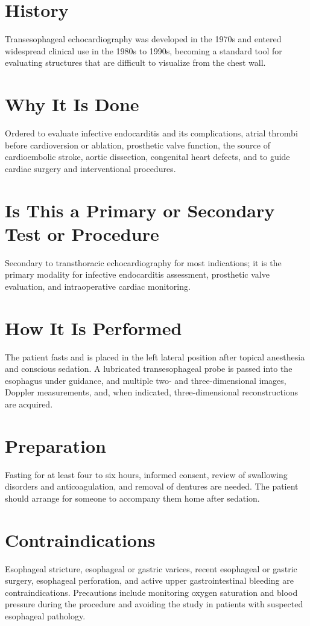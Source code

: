 \section*{History}
Transesophageal echocardiography was developed in the 1970s and entered widespread clinical use in the 1980s to 1990s, becoming a standard tool for evaluating structures that are difficult to visualize from the chest wall.

\section*{Why It Is Done}
Ordered to evaluate infective endocarditis and its complications, atrial thrombi before cardioversion or ablation, prosthetic valve function, the source of cardioembolic stroke, aortic dissection, congenital heart defects, and to guide cardiac surgery and interventional procedures.

\section*{Is This a Primary or Secondary Test or Procedure}
Secondary to transthoracic echocardiography for most indications; it is the primary modality for infective endocarditis assessment, prosthetic valve evaluation, and intraoperative cardiac monitoring.

\section*{How It Is Performed}
The patient fasts and is placed in the left lateral position after topical anesthesia and conscious sedation. A lubricated transesophageal probe is passed into the esophagus under guidance, and multiple two- and three-dimensional images, Doppler measurements, and, when indicated, three-dimensional reconstructions are acquired.

\section*{Preparation}
Fasting for at least four to six hours, informed consent, review of swallowing disorders and anticoagulation, and removal of dentures are needed. The patient should arrange for someone to accompany them home after sedation.

\section*{Contraindications}
Esophageal stricture, esophageal or gastric varices, recent esophageal or gastric surgery, esophageal perforation, and active upper gastrointestinal bleeding are contraindications. Precautions include monitoring oxygen saturation and blood pressure during the procedure and avoiding the study in patients with suspected esophageal pathology.

